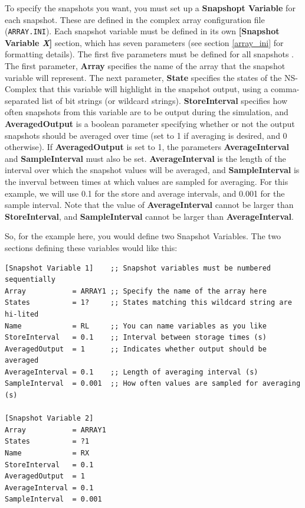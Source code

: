 To specify the snapshots you want, you must set up a \textbf{Snapshopt
  Variable} for each snapshot.  These are defined in the complex array
configuration file (\texttt{ARRAY.INI}).  Each snapshot variable must
be defined in its own \textbf{[Snapshot Variable \emph{X}]} section,
which has seven parameters (see section \ref{array_ini} for formatting
details).  The first five parameters must be defined for all snapshots
.  The first parameter, \textbf{Array} specifies the name of the array
that the snapshot variable will represent.  The next parameter,
\textbf{State} specifies the states of the NS-Complex that this
variable will highlight in the snapshot output, using a
  comma-separated list of bit strings (or wildcard strings).
\textbf{StoreInterval} specifies how often snapshots from this
variable are to be output during the simulation, and
\textbf{AveragedOutput} is a boolean parameter specifying whether or
not the output snapshots should be averaged over time (set to 1 if
averaging is desired, and 0 otherwise).  If \textbf{AveragedOutput} is
set to 1, the parameters \textbf{AverageInterval} and
\textbf{SampleInterval} must also be set.  \textbf{AverageInterval} is
the length of the interval over which the snapshot values will be
averaged, and \textbf{SampleInterval} is the inverval between times at
which values are sampled for averaging.  For this example, we will use
0.1 for the store and average intervals, and 0.001 for the sample
interval.  Note that the value of \textbf{AverageInterval} cannot be
larger than \textbf{StoreInterval}, and \textbf{SampleInterval} cannot
be larger than \textbf{AverageInterval}.


So, for the example here, you would define two Snapshot Variables.
The two sections defining these variables would like this:
\begin{small}
\begin{verbatim}
[Snapshot Variable 1]    ;; Snapshot variables must be numbered sequentially
Array           = ARRAY1 ;; Specify the name of the array here
States          = 1?     ;; States matching this wildcard string are hi-lited
Name            = RL     ;; You can name variables as you like
StoreInterval   = 0.1    ;; Interval between storage times (s)
AveragedOutput  = 1      ;; Indicates whether output should be averaged
AverageInterval = 0.1    ;; Length of averaging interval (s)
SampleInterval  = 0.001  ;; How often values are sampled for averaging (s)

[Snapshot Variable 2]    
Array           = ARRAY1 
States          = ?1     
Name            = RX     
StoreInterval   = 0.1    
AveragedOutput  = 1      
AverageInterval = 0.1    
SampleInterval  = 0.001  
\end{verbatim}
\end{small}

